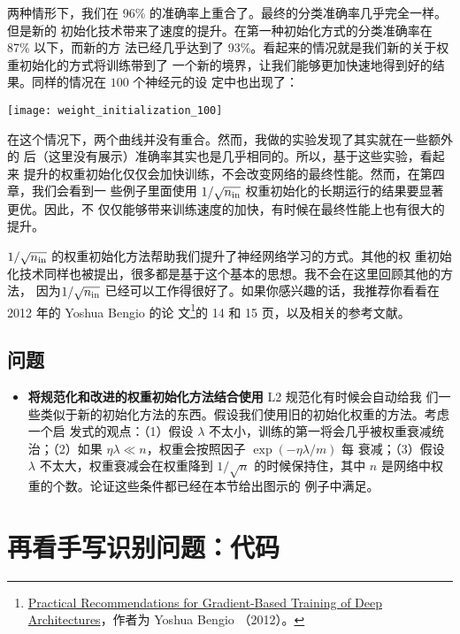 两种情形下，我们在 96\% 的准确率上重合了。最终的分类准确率几乎完全一样。但是新的
初始化技术带来了速度的提升。在第一种初始化方式的分类准确率在 87\% 以下，而新的方
法已经几乎达到了 93\%。看起来的情况就是我们新的关于权重初始化的方式将训练带到了
一个新的境界，让我们能够更加快速地得到好的结果。同样的情况在 $100$ 个神经元的设
定中也出现了：
\begin{center}
    \texttt{[image: weight\_initialization\_100]}
\end{center}

在这个情况下，两个曲线并没有重合。然而，我做的实验发现了其实就在一些额外的%
\epochs{}后（这里没有展示）准确率其实也是几乎相同的。所以，基于这些实验，看起来
提升的权重初始化仅仅会加快训练，不会改变网络的最终性能。然而，在第四章，我们会看到一
些例子里面使用 $1/\sqrt{n_{\rm in}}$ 权重初始化的长期运行的结果要显著更优。因此，不
仅仅能够带来训练速度的加快，有时候在最终性能上也有很大的提升。

$1/\sqrt{n_{\rm in}}$ 的权重初始化方法帮助我们提升了神经网络学习的方式。其他的权
重初始化技术同样也被提出，很多都是基于这个基本的思想。我不会在这里回顾其他的方法，
因为$1/\sqrt{n_{\rm in}}$ 已经可以工作得很好了。如果你感兴趣的话，我推荐你看看在
2012 年的 Yoshua Bengio 的论
文\footnote{\href{http://arxiv.org/pdf/1206.5533v2.pdf}{Practical
    Recommendations for Gradient-Based Training of Deep Architectures}，作者为
  Yoshua Bengio （2012）。}的 14 和 15 页，以及相关的参考文献。

\subsection*{问题}

\begin{itemize}
\item \textbf{将规范化和改进的权重初始化方法结合使用} L2 规范化有时候会自动给我
  们一些类似于新的初始化方法的东西。假设我们使用旧的初始化权重的方法。考虑一个启
  发式的观点：（1）假设 $\lambda$ 不太小，训练的第一\epochs{}将会几乎被权重衰减统
  治；（2）如果 $\eta \lambda \ll n$，权重会按照因子 $\exp(-\eta \lambda / m)$ 每
  \epochs{}衰减；（3）假设 $\lambda$ 不太大，权重衰减会在权重降到 $1/\sqrt{n}$
  的时候保持住，其中 $n$ 是网络中权重的个数。论证这些条件都已经在本节给出图示的
  例子中满足。
\end{itemize}

\section{再看手写识别问题：代码}
\label{sec:handwriting_recognition_revisited_the_code}

